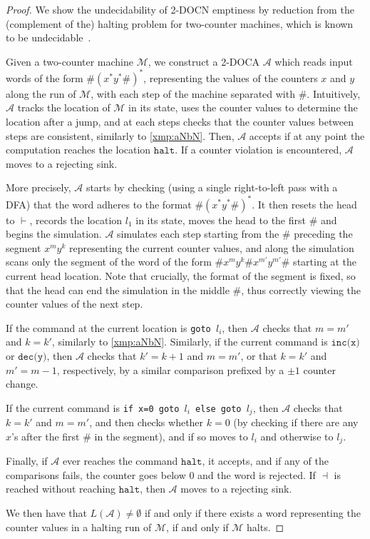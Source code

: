 \documentclass[USenglish]{lipics-v2021}
\newcommand{\lmark}{\vdash}
\newcommand{\rmark}{\dashv}
\newcommand{\cA}{\mathcal{A}}
\newcommand{\cM}{\mathcal{M}}
\begin{document}
\begin{proof}
	We show the undecidability of 2-DOCN emptiness by reduction from the
	(complement of the) halting problem for two-counter machines, which is known to be
	undecidable~\cite{minsky1967computation}.
	
	Given a two-counter machine $\cM$, we construct a 2-DOCA $\cA$ which reads
	input words of the form $\#(x^*y^*\#)^*$, representing the values of the
	counters $x$ and $y$ along the run of $\cM$, with each step of the machine
	separated with $\#$.  Intuitively, $\cA$ tracks the location of $\cM$ in its
	state, uses the counter values to determine the location after a jump, and at
	each steps checks that the counter values between steps are consistent,
	similarly to \cref{xmp:aNbN}.  Then, $\cA$ accepts if at any point the
	computation reaches the location $\texttt{halt}$. If a counter violation is
	encountered, $\cA$ moves to a rejecting sink.
	
	More precisely, $\cA$ starts by checking (using a single right-to-left pass
	with a DFA) that the word adheres to the format $\#(x^*y^*\#)^*$. It then
	resets the head to $\lmark$, records the location $l_1$ in its state, moves
	the head to the first $\#$ and begins the simulation.  $\cA$ simulates each
	step starting from the $\#$ preceding the segment $x^my^k$ representing the
	current counter values, and along the simulation scans only the segment of the
	word of the form $\#x^my^k\#x^{m'}y^{m'}\#$ starting at the current head
	location.  Note that crucially, the format of the segment is fixed, so that
	the head can end the simulation in the middle $\#$, thus correctly viewing the
	counter values of the next step.
	
	If the command at the current location is \texttt{goto $l_i$}, then $\cA$
	checks that $m=m'$ and $k=k'$, similarly to \cref{xmp:aNbN}. Similarly, if the
	current command is $\texttt{inc(x)}$ or $\texttt{dec(y)}$, then $\cA$
	checks that $k'=k+1$ and $m=m'$, or that $k=k'$ and $m'=m-1$, respectively, by
	a similar comparison prefixed by a $\pm1$ counter change.
	
	If the current command is \texttt{if x=0 goto $l_i$ else goto $l_j$},
	then $\cA$ checks that $k=k'$ and $m=m'$, and then checks whether $k=0$ (by
	checking if there are any $x$'s after the first $\#$ in the segment), and if
	so moves to $l_i$ and otherwise to $l_j$.
	
	Finally, if $\cA$ ever reaches the command $\texttt{halt}$, it accepts, and if
	any of the comparisons fails, the counter goes below 0 and the word is
	rejected. If $\rmark$ is reached without reaching $\texttt{halt}$, then $\cA$
	moves to a rejecting sink.
	
	We then have that $L(\cA)\neq \emptyset$ if and only if there exists a word representing
	the counter values in a halting run of $\cM$, if and only if $\cM$ halts.
\end{proof}
\end{document}
